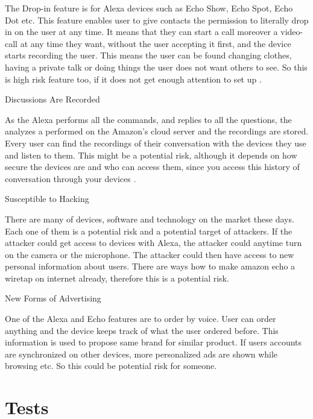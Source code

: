 \documentclass[
  digital, %
  oneside, %
  table,   %
  lof,     %
  lot,     %
]{fithesis3}
\begin{document}
\begin{compactitem}
The Drop-in feature is for Alexa devices such as Echo Show, Echo Spot, Echo Dot etc. This feature enables user to give contacts the permission to literally drop in on the user at any time. It means that they can start a call moreover a video-call at any time they want, without the user accepting it first, and the device starts recording the user. This means the user can be found changing clothes, having a private talk or doing things the user does not want others to see. So this is high risk feature too, if it does not get enough attention to set up \parencite{alexa_dropin}.
  
  \item Discussions Are Recorded
  
As the Alexa performs all the commands, and replies to all the questions, the analyzes a performed on the Amazon's cloud server and the recordings are stored. Every user can find the recordings of their conversation with the devices they use and listen to them. This might be a potential risk, although it depends on how secure the devices are and who can access them, since you access this history of conversation through your devices \parencite{alexa_risks}.
  
  \item Susceptible to Hacking
  
There are many of devices, software and technology on the market these days. Each one of them is a potential risk and a potential target of attackers. If the attacker could get access to devices with Alexa, the attacker could anytime turn on the camera or the microphone. The attacker could then have access to new personal information about users. There are ways how to make amazon echo a wiretap on internet already, therefore this is a potential risk.
  
  \item New Forms of Advertising
  
One of the Alexa and Echo features are to order by voice. User can order anything and the device keeps track of what the user ordered before. This information is used to propose same brand for similar product. If users accounts are synchronized on other devices, more personalized ads are shown while browsing etc. So this could be potential risk for someone.

\end{compactitem}

\section{Tests}
\end{document}
